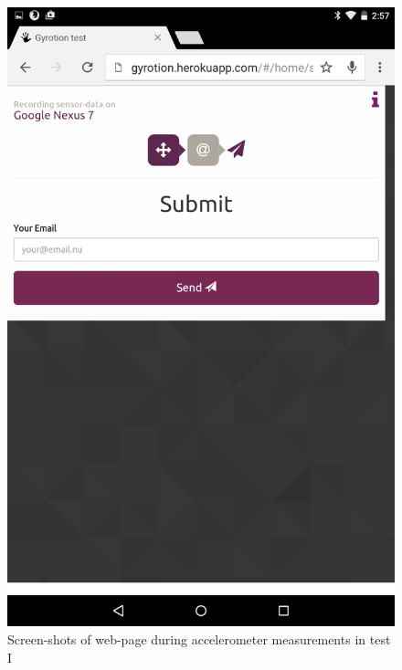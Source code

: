 \begin{figure}[!htb]
\begin{minipage}[c]{.23\textwidth}
    \includegraphics[scale=0.1]{img/Nexus-submit}
  \end{minipage}
  \caption{Screen-shots of web-page during accelerometer measurements in test I}
  \label{fig:gyrotion}
\end{figure}

